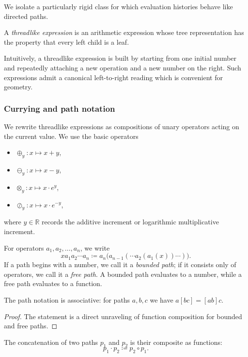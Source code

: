 We isolate a particularly rigid class for which evaluation histories behave like directed paths.

\begin{definition}\label{def:flow-threadlike}
A \emph{threadlike expression} is an arithmetic expression whose tree representation has the property that every left child is a leaf.
\end{definition}

Intuitively, a threadlike expression is built by starting from one initial number and repeatedly attaching a new operation and a new number on the right. Such expressions admit a canonical left-to-right reading which is convenient for geometry.

\subsubsection*{Currying and path notation}
We rewrite threadlike expressions as compositions of unary operators acting on the current value. We use the basic operators
\begin{itemize}
    \item $\oplus_y : x \mapsto x+y$,
    \item $\ominus_y : x \mapsto x-y$,
    \item $\otimes_y : x \mapsto x\cdot e^y$,
    \item $\oslash_y : x \mapsto x\cdot e^{-y}$,
\end{itemize}
where $y\in\mathbb{R}$ records the additive increment or logarithmic multiplicative increment.

For operators $a_1,a_2,\dots,a_n$, we write
\[
xa_1a_2\cdots a_n \coloneqq a_n\bigl(a_{n-1}(\cdots a_2(a_1(x))\cdots)\bigr).
\]
If a path begins with a number, we call it a \emph{bounded path}; if it consists only of operators, we call it a \emph{free path}. A bounded path evaluates to a number, while a free path evaluates to a function.

\begin{lemma}\label{lemma:flow-associative}
The path notation is associative: for paths $a,b,c$ we have $a[bc]=[ab]c$.
\end{lemma}

\begin{proof}
The statement is a direct unraveling of function composition for bounded and free paths.
\end{proof}

\begin{definition}\label{definition:flow-concatenate}
The concatenation of two paths $p_1$ and $p_2$ is their composite as functions:
\[
p_1\cdot p_2 \coloneqq p_2\circ p_1.
\]
\end{definition}

